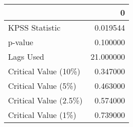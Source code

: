 \begin{tabular}{lr}
\toprule
{} &          0 \\
\midrule
KPSS Statistic        &   0.019544 \\
p-value               &   0.100000 \\
Lags Used             &  21.000000 \\
Critical Value (10\%)  &   0.347000 \\
Critical Value (5\%)   &   0.463000 \\
Critical Value (2.5\%) &   0.574000 \\
Critical Value (1\%)   &   0.739000 \\
\bottomrule
\end{tabular}
